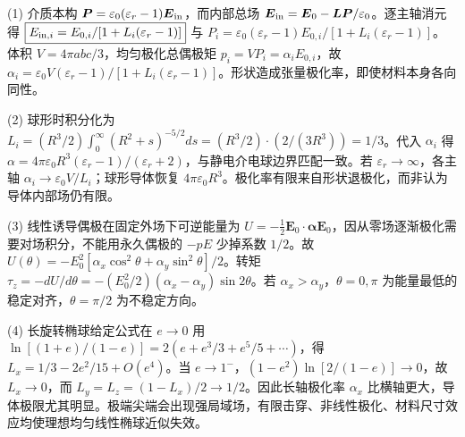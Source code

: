 (1) 介质本构 \(\boldsymbol P=\varepsilon_0(\varepsilon_r-1)\boldsymbol E_{\rm in}\)，而内部总场 \(\boldsymbol E_{\rm in}=\boldsymbol E_0-\boldsymbol L\boldsymbol P/\varepsilon_0\)。逐主轴消元得 \(\boxed{E_{{\rm in},i}=E_{0,i}/[1+L_i(\varepsilon_r-1)]}\) 与 \(P_i=\varepsilon_0(\varepsilon_r-1)E_{0,i}/[1+L_i(\varepsilon_r-1)]\)。体积 \(V=4\pi abc/3\)，均匀极化总偶极矩 \(p_i=VP_i=\alpha_iE_{0,i}\)，故 \(\boxed{\alpha_i=\varepsilon_0V(\varepsilon_r-1)/[1+L_i(\varepsilon_r-1)]}\)。形状造成张量极化率，即使材料本身各向同性。

(2) 球形时积分化为 \(L_i=(R^3/2)\int_0^\infty(R^2+s)^{-5/2}ds=(R^3/2)\cdot(2/(3R^3))=1/3\)。代入 \(\alpha_i\) 得 \(\alpha=4\pi\varepsilon_0R^3(\varepsilon_r-1)/(\varepsilon_r+2)\)，与静电介电球边界匹配一致。若 \(\varepsilon_r\to\infty\)，各主轴 \(\boxed{\alpha_i\to\varepsilon_0V/L_i}\)；球形导体恢复 \(4\pi\varepsilon_0R^3\)。极化率有限来自形状退极化，而非认为导体内部场仍有限。

(3) 线性诱导偶极在固定外场下可逆能量为 \(U=-\frac12\boldsymbol E_0\cdot\boldsymbol\alpha\boldsymbol E_0\)，因从零场逐渐极化需要对场积分，不能用永久偶极的 \(-pE\) 少掉系数 \(1/2\)。故 \(U(\theta)=-E_0^2[\alpha_x\cos^2\theta+\alpha_y\sin^2\theta]/2\)。转矩 \(\boxed{\tau_z=-dU/d\theta=-(E_0^2/2)(\alpha_x-\alpha_y)\sin2\theta}\)。若 \(\alpha_x>\alpha_y\)，\(\theta=0,\pi\) 为能量最低的稳定对齐，\(\theta=\pi/2\) 为不稳定方向。

(4) 长旋转椭球给定公式在 \(e\to0\) 用 \(\ln[(1+e)/(1-e)]=2(e+e^3/3+e^5/5+\cdots)\)，得 \(L_x=1/3-2e^2/15+O(e^4)\)。当 \(e\to1^-\)，\((1-e^2)\ln[2/(1-e)]\to0\)，故 \(L_x\to0\)，而 \(L_y=L_z=(1-L_x)/2\to1/2\)。因此长轴极化率 \(\alpha_x\) 比横轴更大，导体极限尤其明显。极端尖端会出现强局域场，有限击穿、非线性极化、材料尺寸效应均使理想均匀线性椭球近似失效。
